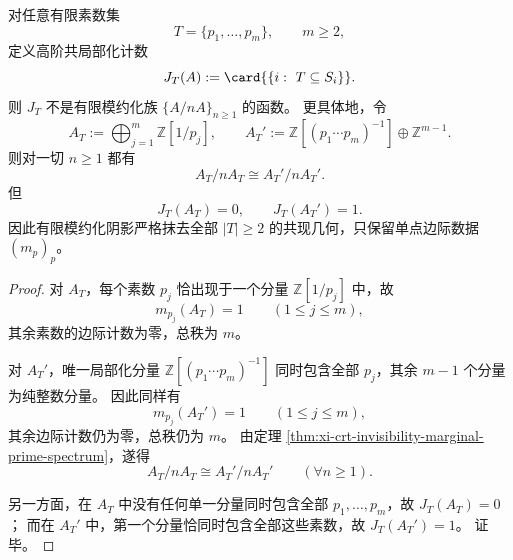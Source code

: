 \begin{corollary}[高阶共局部化张量的有限模不可见性]\label{cor:xi-crt-indistinguishable-pair}
对任意有限素数集
\[
T=\{p_1,\dots,p_m\},
\qquad
m\ge 2,
\]
定义高阶共局部化计数
\[
J_T(A):=\card{\{i:\ T\subseteq S_i\}}.
\]
则 \(J_T\) 不是有限模约化族 \(\{A/nA\}_{n\ge 1}\) 的函数。
更具体地，令
\[
A_T:=\bigoplus_{j=1}^{m}\mathbb Z[1/p_j],
\qquad
A_T':=\mathbb Z[(p_1\cdots p_m)^{-1}]\oplus \mathbb Z^{m-1}.
\]
则对一切 \(n\ge 1\) 都有
\[
\boxed{\;A_T/nA_T\cong A_T'/nA_T'.\;}
\]
但
\[
\boxed{\;J_T(A_T)=0,\qquad J_T(A_T')=1.\;}
\]
因此有限模约化阴影严格抹去全部 \(|T|\ge 2\) 的共现几何，只保留单点边际数据 \((m_p)_p\)。
\end{corollary}
\begin{proof}
对 \(A_T\)，每个素数 \(p_j\) 恰出现于一个分量 \(\mathbb Z[1/p_j]\) 中，故
\[
m_{p_j}(A_T)=1
\qquad(1\le j\le m),
\]
其余素数的边际计数为零，总秩为 \(m\)。

对 \(A_T'\)，唯一局部化分量 \(\mathbb Z[(p_1\cdots p_m)^{-1}]\) 同时包含全部 \(p_j\)，其余 \(m-1\) 个分量为纯整数分量。
因此同样有
\[
m_{p_j}(A_T')=1
\qquad(1\le j\le m),
\]
其余边际计数仍为零，总秩仍为 \(m\)。
由定理 \ref{thm:xi-crt-invisibility-marginal-prime-spectrum}，遂得
\[
A_T/nA_T\cong A_T'/nA_T'
\qquad(\forall n\ge 1).
\]

另一方面，在 \(A_T\) 中没有任何单一分量同时包含全部 \(p_1,\dots,p_m\)，故 \(J_T(A_T)=0\)；
而在 \(A_T'\) 中，第一个分量恰同时包含全部这些素数，故 \(J_T(A_T')=1\)。
证毕。
\end{proof}

\endinput
